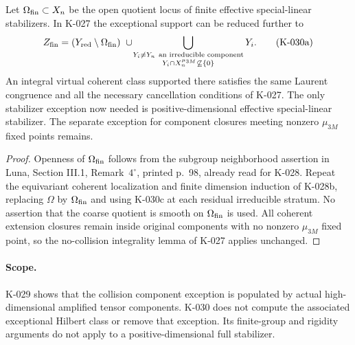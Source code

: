 \begin{corollary}[K-030d]
Let $\Omega_{\rm fin}\subset X_n$ be the open quotient locus
of finite effective special-linear stabilizers.  In K-027 the
exceptional support can be reduced further to
\[
 Z_{\rm fin}=(Y_{\rm red}\setminus\Omega_{\rm fin})
 \ \cup\!
 \bigcup_{\substack{Y_i\ne Y_n\ \text{an irreducible component}\\
              Y_i\cap X_n^{\mu_{3M}}\not\subseteq\{0\}}}Y_i.
                                                        \tag{K-030a}
\]
An integral virtual coherent class supported there satisfies
the same Laurent congruence and all the necessary cancellation
conditions of K-027.  The only stabilizer exception now needed
is positive-dimensional effective special-linear stabilizer.
The separate exception for component closures meeting nonzero
$\mu_{3M}$ fixed points remains.
\end{corollary}

\begin{proof}
Openness of $\Omega_{\rm fin}$ follows from the subgroup
neighborhood assertion in Luna, Section III.1, Remark~$4^\circ$,
printed p.~98, already read for K-028.  Repeat the equivariant
coherent localization and finite dimension induction of K-028b,
replacing $\Omega$ by $\Omega_{\rm fin}$ and using K-030c at
each residual irreducible stratum.  No assertion that the coarse
quotient is smooth on $\Omega_{\rm fin}$ is used.  All coherent
extension closures remain inside original components with no
nonzero $\mu_{3M}$ fixed point, so the no-collision integrality
lemma of K-027 applies unchanged.
\end{proof}

\paragraph{Scope.}
K-029 shows that the collision component exception is populated
by actual high-dimensional amplified tensor components.  K-030
does not compute the associated exceptional Hilbert class or
remove that exception.  Its finite-group and rigidity arguments
do not apply to a positive-dimensional full stabilizer.
